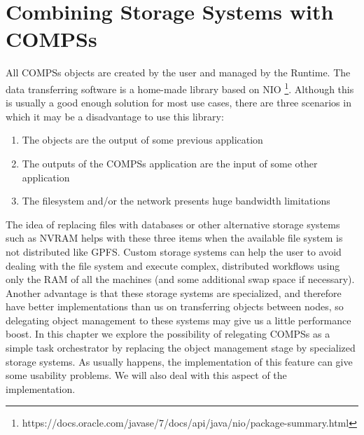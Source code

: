 \chapter{Combining Storage Systems with COMPSs}
\label{sec:storage}
All COMPSs objects are created by the user and managed by the Runtime. The data transferring software is a home-made library based on NIO \footnote{https://docs.oracle.com/javase/7/docs/api/java/nio/package-summary.html}. Although this is usually a good enough solution for most use cases, there are three scenarios in which it may be a disadvantage to use this library:

\begin{enumerate}
\item The objects are the output of some previous application
\item The outputs of the COMPSs application are the input of some other application
\item The filesystem and/or the network presents huge bandwidth limitations
\end{enumerate}

The idea of replacing files with databases or other alternative storage systems such as NVRAM helps with these three items when the available file system is not distributed like GPFS. Custom storage systems can help the user to avoid dealing with the file system and execute complex, distributed workflows using only the RAM of all the machines (and some additional swap space if necessary). Another advantage is that these storage systems are specialized, and therefore have better implementations than us on transferring objects between nodes, so delegating object management to these systems may give us a little performance boost. In this chapter we explore the possibility of relegating COMPSs as a simple task orchestrator by replacing the object management stage by specialized storage systems. As usually happens, the implementation of this feature can give some usability problems. We will also deal with this aspect of the implementation.


